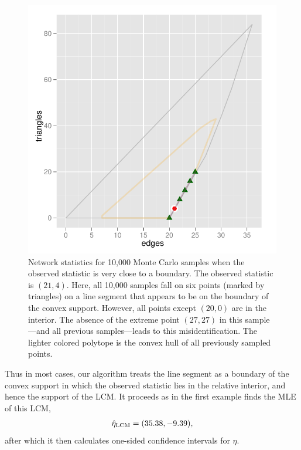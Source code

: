 \begin{figure}[h!]
\centering
\includegraphics[width=5in]{Figures/MCsample-fakeface}
\caption[Network statistics for 10,000 Monte Carlo samples when the observed 
statistic is very close to a boundary]
{Network statistics for 10,000 Monte Carlo samples when the observed 
statistic is very close to a boundary.  The observed statistic is $(21,4)$.  Here, 
all 10,000 samples fall on six points (marked by triangles) on a line segment 
that appears to be on the boundary of the convex support.  However,
all points except $(20,0)$ are in the interior.  The absence of the 
extreme point $(27,27)$ in this sample---and all previous samples---leads
to this misidentification.
The lighter colored polytope is the convex hull of all previously 
sampled points.}
\label{F:MC problem}
\end{figure}

Thus in most cases, our algorithm treats the line segment as a boundary of the 
convex support in which the observed statistic lies in the relative interior, and 
hence the support of the LCM.  It proceeds as in the first
example finds the MLE of this LCM,
\begin{align*}
	\hat{\eta}_{\textrm{LCM}} = (35.38, -9.39),
\end{align*}
after which it then calculates one-sided confidence intervals for $\eta$.

